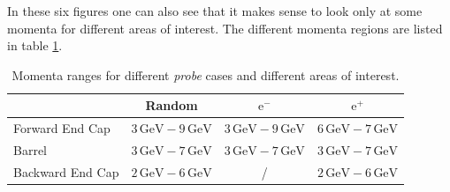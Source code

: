 \documentclass[a4paper,11pt,twosided,final,german,openbib,pdftex,listof=totoc,bibliography=totoc]{scrbook}
\begin{document}
In these six figures one can also see that it makes sense to look only at some momenta for different areas of interest. The different momenta regions are listed in table \ref{tab:RTPMDTable}.


\begin{table}[h!]
	\centering
	\begin{tabular}{lccc}
		&Random&$\textrm{e}^-$ &$\textrm{e}^+$\\
		\hline
		Forward End Cap &$3\,\textrm{GeV} - 9\,\textrm{GeV}$&$3\,\textrm{GeV} - 9\,\textrm{GeV}$&$6\,\textrm{GeV} - 7\,\textrm{GeV}$\\
		Barrel &$3\,\textrm{GeV} - 7\,\textrm{GeV}$&$3\,\textrm{GeV} - 7\,\textrm{GeV}$&$3\,\textrm{GeV} - 7\,\textrm{GeV}$\\
		Backward End Cap &$2\,\textrm{GeV} - 6\,\textrm{GeV}$& /&$2\,\textrm{GeV} - 6\,\textrm{GeV}$\\	
	\end{tabular}
	
	\caption[Areas Of Interest Different Momenta Ranges]{Momenta ranges for different \textit{probe} cases and different areas of interest.}
	\label{tab:RTPMDTable}
\end{table}
\end{document}
